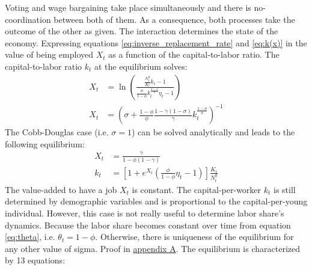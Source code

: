 Voting and wage bargaining take place simultaneously and there is no-coordination between both of them. As a consequence, both processes take the outcome of the other as given. The interaction determines the state of the economy. Expressing equations \eqref{eq:inverse_replacement_rate} and \eqref{eq:k(x)} in the value of being employed $X_t$ as a function of the capital-to-labor ratio. The capital-to-labor ratio $k_t$ at the equilibrium solves:
	\begin{align}
		\label{eq:Xg} 
		X_t &= \ln\left( \frac{ \frac{N_t^y}{K_t} k_t - 1 } { \frac{\phi}{1-\phi} k_t^{\frac{\sigma-1}{\sigma}} \eta_t - 1 }\right) \\
		\label{eq:Xh}
		X_t &= \left( \sigma + \frac{1-\phi}{\phi} \frac{1-\gamma(1-\sigma)}{\gamma} k_t^{\frac{1-\sigma}{\sigma}} \right)^{-1} 
	\end{align}
The Cobb-Douglas case (i.e. $\sigma = 1$) can be solved analytically and leads to the following equilibrium:
	\begin{align*}
		X_t &= \frac{\gamma}{1-\phi(1-\gamma)} \\
		k_t &= \left[1 + e^{X_t}\left(\frac{\phi}{1-\phi}\eta_t-1\right)\right]\frac{K_t}{N_t^y}
	\end{align*}
The value-added to have a job $X_t$ is constant. The capital-per-worker $k_t$ is still determined by demographic variables and is proportional to the capital-per-young individual. However, this case is not really useful to determine labor share's dynamics. Because the labor share becomes constant over time from equation \eqref{eq:theta}, i.e. $\theta_t = 1-\phi$. Otherwise, there is uniqueness of the equilibrium for any other value of sigma. Proof in \hyperref[appendix:uniqueness]{appendix A}. The equilibrium is characterized by 13 equations:
